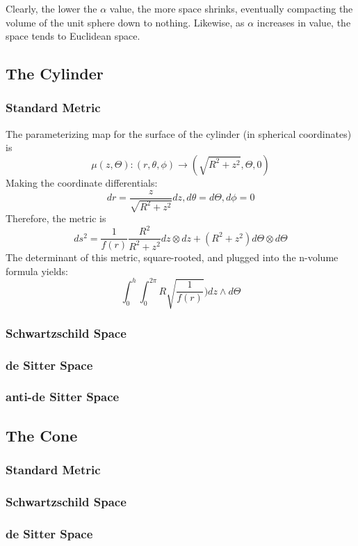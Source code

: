 \documentclass{article}
\begin{document}
Clearly, the lower the $\alpha$ value, the more space shrinks, eventually compacting the volume of the unit sphere down to nothing. Likewise, as $\alpha$ increases in value, the space tends to Euclidean space.

\newpage
\subsection{The Cylinder}
\subsubsection{Standard Metric}
The parameterizing map for the surface of the cylinder (in spherical coordinates) is
\[
\mu(z, \Theta): (r, \theta, \phi) \rightarrow (\sqrt{R^2 + z^2}, \Theta, 0)
\]
Making the coordinate differentials:
\[
dr = \frac{z}{\sqrt{R^2+z^2}}dz, d\theta = d\Theta, d\phi = 0
\]
Therefore, the metric is
\[
ds^2 = \frac{1}{f(r)}\frac{R^2}{R^2+z^2} dz \otimes dz + (R^2 + z^2) d\Theta \otimes d\Theta
\]
The determinant of this metric, square-rooted, and plugged into the n-volume formula yields:
\[
\int_0^h\int_0^{2\pi} R\sqrt{\frac{1}{f(r)}}) dz \wedge d\Theta
\]

\subsubsection{Schwartzschild Space}
\subsubsection{de Sitter Space}
\subsubsection{anti-de Sitter Space}

\newpage
\subsection{The Cone}
\subsubsection{Standard Metric}
\subsubsection{Schwartzschild Space}
\subsubsection{de Sitter Space}
\end{document}
